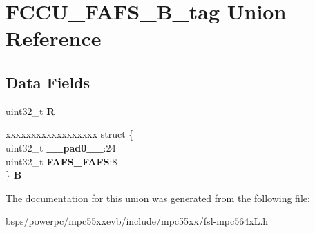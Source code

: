 \hypertarget{unionFCCU__FAFS__32B__tag}{}\section{F\+C\+C\+U\+\_\+\+F\+A\+F\+S\+\_\+B\+\_\+tag Union Reference}
\label{unionFCCU__FAFS__32B__tag}
\subsection*{Data Fields}
\begin{DoxyCompactItemize}
\item 
\mbox{\label{unionFCCU__FAFS__32B__tag_ae90da40dd95142d311fef1e85ecc3142}} 
uint32\+\_\+t {\bfseries R}
\item 
\mbox{\label{unionFCCU__FAFS__32B__tag_aeecd7c0e4c847e605156924ab816b8fb}} 
\begin{tabbing}
xx\=xx\=xx\=xx\=xx\=xx\=xx\=xx\=xx\=\kill
struct \{\\
\>uint32\_t {\bfseries \_\_pad0\_\_}:24\\
\>uint32\_t {\bfseries FAFS\_FAFS}:8\\
\} {\bfseries B}\\

\end{tabbing}\end{DoxyCompactItemize}


The documentation for this union was generated from the following file\+:\begin{DoxyCompactItemize}
\item 
bsps/powerpc/mpc55xxevb/include/mpc55xx/fsl-\/mpc564x\+L.\+h\end{DoxyCompactItemize}
